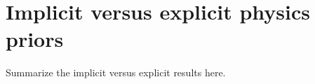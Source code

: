 \chapter{Implicit versus explicit physics priors}
\label{app:priors}

Summarize the implicit versus explicit results here.

